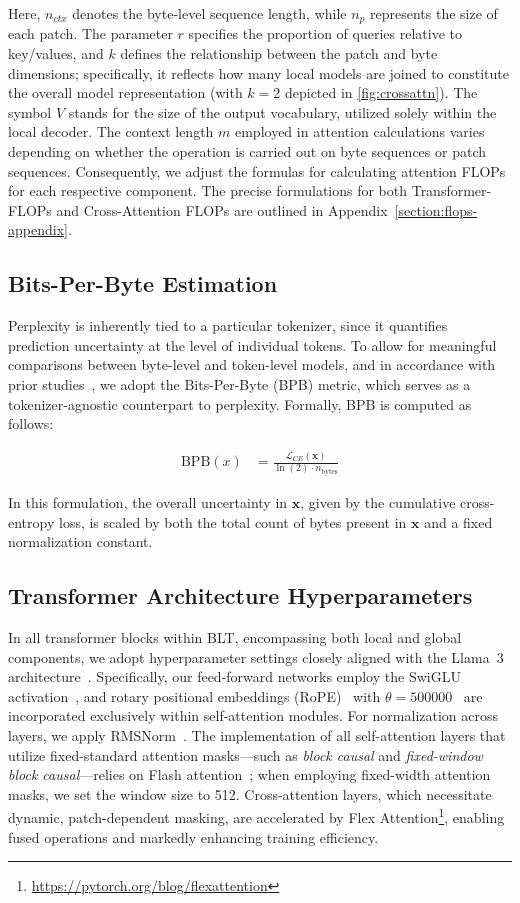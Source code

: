 Here, $n_{ctx}$ denotes the byte-level sequence length, while $n_p$ represents the size of each patch. The parameter $r$ specifies the proportion of queries relative to key/values, and $k$ defines the relationship between the patch and byte dimensions; specifically, it reflects how many local models are joined to constitute the overall model representation (with $k=2$ depicted in \autoref{fig:crossattn}). The symbol $V$ stands for the size of the output vocabulary, utilized solely within the local decoder. The context length $m$ employed in attention calculations varies depending on whether the operation is carried out on byte sequences or patch sequences. Consequently, we adjust the formulas for calculating attention FLOPs for each respective component. The precise formulations for both Transformer-FLOPs and Cross-Attention FLOPs are outlined in Appendix~\ref{section:flops-appendix}.

\subsection{Bits-Per-Byte Estimation} Perplexity is inherently tied to a particular tokenizer, since it quantifies prediction uncertainty at the level of individual tokens. To allow for meaningful comparisons between byte-level and token-level models, and in accordance with prior studies~\citep{xue2022byt5, yu2023megabyte, wang2024mambabyte}, we adopt the Bits-Per-Byte (BPB) metric, which serves as a tokenizer-agnostic counterpart to perplexity. Formally, BPB is computed as follows:

\begin{align}
    \text{BPB}(x)&= \frac{\mathcal{L}_{CE}(\pmb{x})}{\ln(2)\cdot n_{\text{bytes}}}
\end{align}

In this formulation, the overall uncertainty in $\pmb{x}$, given by the cumulative cross-entropy loss, is scaled by both the total count of bytes present in $\pmb{x}$ and a fixed normalization constant.

\subsection{Transformer Architecture Hyperparameters} In all transformer blocks within {\textsc BLT}, encompassing both local and global components, we adopt hyperparameter settings closely aligned with the Llama~3 architecture~\citep{dubey2024llama}. Specifically, our feed-forward networks employ the SwiGLU activation~\citep{swiglu}, and rotary positional embeddings (RoPE)~\citep{RoPe} with $\theta=500000$~\citep{xiong2024effective} are incorporated exclusively within self-attention modules. For normalization across layers, we apply RMSNorm~\citep{RMSNorm}. The implementation of all self-attention layers that utilize fixed-standard attention masks—such as \textit{block causal} and \textit{fixed-window block causal}—relies on Flash attention~\citep{dao2022flashattention}; when employing fixed-width attention masks, we set the window size to 512. Cross-attention layers, which necessitate dynamic, patch-dependent masking, are accelerated by Flex Attention\footnote{\url{https://pytorch.org/blog/flexattention}}, enabling fused operations and markedly enhancing training efficiency.

